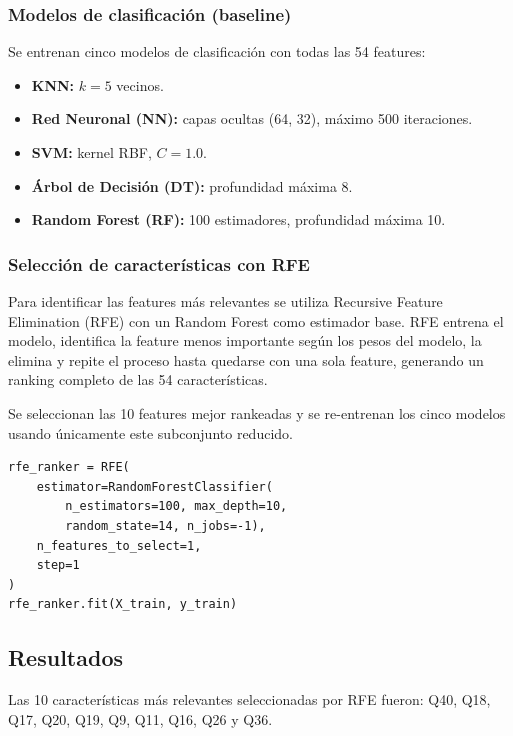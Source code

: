 \documentclass{article}
\begin{document}
\subsubsection{Modelos de clasificación (baseline)}

Se entrenan cinco modelos de clasificación con todas las 54 features:

\begin{itemize}
    \item \textbf{KNN:} $k=5$ vecinos.
    \item \textbf{Red Neuronal (NN):} capas ocultas (64, 32), máximo 500 iteraciones.
    \item \textbf{SVM:} kernel RBF, $C=1.0$.
    \item \textbf{Árbol de Decisión (DT):} profundidad máxima 8.
    \item \textbf{Random Forest (RF):} 100 estimadores, profundidad máxima 10.
\end{itemize}

\subsubsection{Selección de características con RFE}

Para identificar las features más relevantes se utiliza Recursive Feature Elimination (RFE) con un Random Forest como estimador base. RFE entrena el modelo, identifica la feature menos importante según los pesos del modelo, la elimina y repite el proceso hasta quedarse con una sola feature, generando un ranking completo de las 54 características.

Se seleccionan las 10 features mejor rankeadas y se re-entrenan los cinco modelos usando únicamente este subconjunto reducido.

\begin{lstlisting}
rfe_ranker = RFE(
    estimator=RandomForestClassifier(
        n_estimators=100, max_depth=10,
        random_state=14, n_jobs=-1),
    n_features_to_select=1,
    step=1
)
rfe_ranker.fit(X_train, y_train)
\end{lstlisting}

\subsection{Resultados}

Las 10 características más relevantes seleccionadas por RFE fueron: Q40, Q18, Q17, Q20, Q19, Q9, Q11, Q16, Q26 y Q36.
\end{document}
